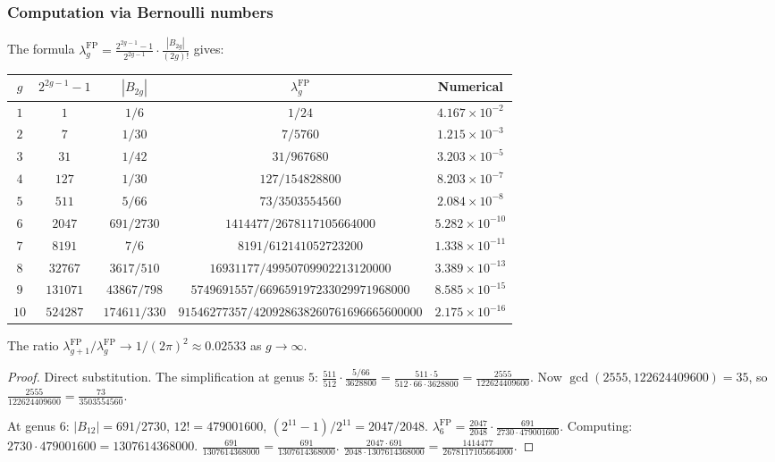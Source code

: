\subsubsection{Computation via Bernoulli numbers}

\begin{computation}
\label{comp:thqg-I-fp-detailed}
The formula $\lambda_g^{\mathrm{FP}} = \frac{2^{2g-1}-1}{2^{2g-1}} \cdot \frac{|B_{2g}|}{(2g)!}$ gives:
\begin{center}
\renewcommand{\arraystretch}{1.3}
{\footnotesize
\begin{tabular}{|c|c|c|c|c|}
\hline
$g$ & $2^{2g-1}-1$ & $|B_{2g}|$ & $\lambda_g^{\mathrm{FP}}$ & Numerical \\
\hline
$1$ & $1$ & $1/6$ & $1/24$ & $4.167 \times 10^{-2}$ \\
$2$ & $7$ & $1/30$ & $7/5760$ & $1.215 \times 10^{-3}$ \\
$3$ & $31$ & $1/42$ & $31/967680$ & $3.203 \times 10^{-5}$ \\
$4$ & $127$ & $1/30$ & $127/154828800$ & $8.203 \times 10^{-7}$ \\
$5$ & $511$ & $5/66$ & $73/3503554560$ & $2.084 \times 10^{-8}$ \\
$6$ & $2047$ & $691/2730$ & $1414477/2678117105664000$ & $5.282 \times 10^{-10}$ \\
$7$ & $8191$ & $7/6$ & $8191/612141052723200$ & $1.338 \times 10^{-11}$ \\
$8$ & $32767$ & $3617/510$ & $16931177/49950709902213120000$ & $3.389 \times 10^{-13}$ \\
$9$ & $131071$ & $43867/798$ & $5749691557/669659197233029971968000$ & $8.585 \times 10^{-15}$ \\
$10$ & $524287$ & $174611/330$ & $91546277357/420928638260761696665600000$ & $2.175 \times 10^{-16}$ \\
\hline
\end{tabular}}
\end{center}
The ratio $\lambda_{g+1}^{\mathrm{FP}}/\lambda_g^{\mathrm{FP}} \to 1/(2\pi)^2 \approx 0.02533$ as $g \to \infty$.
\end{computation}

\begin{proof}
Direct substitution. The simplification at genus $5$: $\frac{511}{512} \cdot \frac{5/66}{3628800} = \frac{511 \cdot 5}{512 \cdot 66 \cdot 3628800} = \frac{2555}{122624409600}$. Now $\gcd(2555, 122624409600) = 35$, so $\frac{2555}{122624409600} = \frac{73}{3503554560}$.

At genus $6$: $|B_{12}| = 691/2730$, $12! = 479001600$, $(2^{11}-1)/2^{11} = 2047/2048$. $\lambda_6^{\mathrm{FP}} = \frac{2047}{2048} \cdot \frac{691}{2730 \cdot 479001600}$. Computing: $2730 \cdot 479001600 = 1307614368000$. $\frac{691}{1307614368000} = \frac{691}{1307614368000}$. $\frac{2047 \cdot 691}{2048 \cdot 1307614368000} = \frac{1414477}{2678117105664000}$.
\end{proof}

